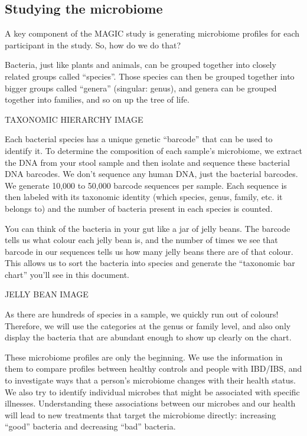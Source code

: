 \documentclass[
]{article}
\begin{document}
\subsection{Studying the microbiome}

A key component of the MAGIC study is generating microbiome profiles for
each participant in the study. So, how do we do that?

Bacteria, just like plants and animals, can be grouped together into
closely related groups called ``species''. Those species can then be
grouped together into bigger groups called ``genera'' (singular: genus),
and genera can be grouped together into families, and so on up the tree
of life.

TAXONOMIC HIERARCHY IMAGE

Each bacterial species has a unique genetic ``barcode'' that can be used
to identify it. To determine the composition of each sample's
microbiome, we extract the DNA from your stool sample and then isolate
and sequence these bacterial DNA barcodes. We don't sequence any human
DNA, just the bacterial barcodes. We generate 10,000 to 50,000 barcode
sequences per sample. Each sequence is then labeled with its taxonomic
identity (which species, genus, family, etc. it belongs to) and the
number of bacteria present in each species is counted.

You can think of the bacteria in your gut like a jar of jelly beans. The
barcode tells us what colour each jelly bean is, and the number of times
we see that barcode in our sequences tells us how many jelly beans there
are of that colour. This allows us to sort the bacteria into species and
generate the ``taxonomic bar chart'' you'll see in this document.

JELLY BEAN IMAGE

As there are hundreds of species in a sample, we quickly run out of
colours! Therefore, we will use the categories at the genus or family
level, and also only display the bacteria that are abundant enough to
show up clearly on the chart.

These microbiome profiles are only the beginning. We use the information
in them to compare profiles between healthy controls and people with
IBD/IBS, and to investigate ways that a person's microbiome changes with
their health status. We also try to identify individual microbes that
might be associated with specific illnesses. Understanding these
associations between our microbes and our health will lead to new
treatments that target the microbiome directly: increasing ``good''
bacteria and decreasing ``bad'' bacteria.
\end{document}

